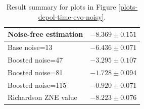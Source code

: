 \begin{table}
\caption{Result summary for plots in Figure \ref{plots-depol-time-evo-noisy}.}
\begin{tabular*}{\textwidth}{@{\extracolsep{\fill}}ll@{}}
\toprule

Noise-free estimation & $-8.369 \pm 0.151$ \\
\midrule
Base noise=13 & $-6.436 \pm 0.071$ \\
Boosted noise=47 & $-3.295 \pm 0.107$ \\
Boosted noise=81 & $-1.728 \pm 0.094$ \\
Boosted noise=115 & $-0.920 \pm 0.071$ \\
\midrule
Richardson ZNE value & $-8.223 \pm 0.076$ \\
\bottomrule
\end{tabular*}
\label{table-depol-time-evo-noisy}
\end{table}
